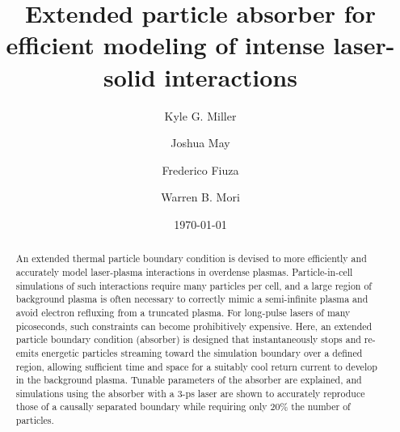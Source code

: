 \documentclass[%
 aip,
 amsmath,amssymb,
 reprint,%
]{revtex4-2}
\begin{document}

\title{Extended particle absorber for efficient modeling of intense laser-solid interactions}
\author{Kyle G. Miller}

\author{Joshua May}

\author{Frederico Fiuza}

\author{Warren B. Mori}

\date{\today}%

\begin{abstract}
An extended thermal particle boundary condition is devised to more efficiently and accurately model laser-plasma interactions in overdense plasmas.  Particle-in-cell simulations of such interactions require many particles per cell, and a large region of background plasma is often necessary to correctly mimic a semi-infinite plasma and avoid electron refluxing from a truncated plasma. For long-pulse lasers of many picoseconds, such constraints can become prohibitively expensive.  Here, an extended particle boundary condition (absorber) is designed that instantaneously stops and re-emits energetic particles streaming toward the simulation boundary over a defined region, allowing sufficient time and space for a suitably cool return current to develop in the background plasma.  Tunable parameters of the absorber are explained, and simulations using the absorber with a 3-ps laser are shown to accurately reproduce those of a causally separated boundary while requiring only 20\% the number of particles.
\end{abstract}

\maketitle
\end{document}
